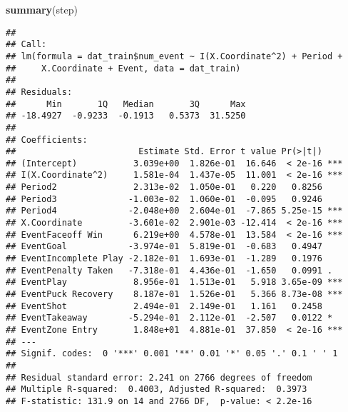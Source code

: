 \documentclass[
  a3paper,
]{article}
\newenvironment{Shaded}{\begin{snugshade}}{\end{snugshade}}
\newcommand{\AttributeTok}[1]{\textcolor[rgb]{0.13,0.29,0.53}{#1}}
\newcommand{\CommentTok}[1]{\textcolor[rgb]{0.56,0.35,0.01}{\textit{#1}}}
\newcommand{\DecValTok}[1]{\textcolor[rgb]{0.00,0.00,0.81}{#1}}
\newcommand{\FunctionTok}[1]{\textcolor[rgb]{0.13,0.29,0.53}{\textbf{#1}}}
\newcommand{\NormalTok}[1]{#1}
\newcommand{\OtherTok}[1]{\textcolor[rgb]{0.56,0.35,0.01}{#1}}
\newcommand{\SpecialCharTok}[1]{\textcolor[rgb]{0.81,0.36,0.00}{\textbf{#1}}}
\begin{document}
\begin{Shaded}
\begin{Highlighting}[]
\FunctionTok{summary}\NormalTok{(step)}
\end{Highlighting}
\end{Shaded}

\begin{verbatim}
## 
## Call:
## lm(formula = dat_train$num_event ~ I(X.Coordinate^2) + Period + 
##     X.Coordinate + Event, data = dat_train)
## 
## Residuals:
##      Min       1Q   Median       3Q      Max 
## -18.4927  -0.9233  -0.1913   0.5373  31.5250 
## 
## Coefficients:
##                        Estimate Std. Error t value Pr(>|t|)    
## (Intercept)           3.039e+00  1.826e-01  16.646  < 2e-16 ***
## I(X.Coordinate^2)     1.581e-04  1.437e-05  11.001  < 2e-16 ***
## Period2               2.313e-02  1.050e-01   0.220   0.8256    
## Period3              -1.003e-02  1.060e-01  -0.095   0.9246    
## Period4              -2.048e+00  2.604e-01  -7.865 5.25e-15 ***
## X.Coordinate         -3.601e-02  2.901e-03 -12.414  < 2e-16 ***
## EventFaceoff Win      6.219e+00  4.578e-01  13.584  < 2e-16 ***
## EventGoal            -3.974e-01  5.819e-01  -0.683   0.4947    
## EventIncomplete Play -2.182e-01  1.693e-01  -1.289   0.1976    
## EventPenalty Taken   -7.318e-01  4.436e-01  -1.650   0.0991 .  
## EventPlay             8.956e-01  1.513e-01   5.918 3.65e-09 ***
## EventPuck Recovery    8.187e-01  1.526e-01   5.366 8.73e-08 ***
## EventShot             2.494e-01  2.149e-01   1.161   0.2458    
## EventTakeaway        -5.294e-01  2.112e-01  -2.507   0.0122 *  
## EventZone Entry       1.848e+01  4.881e-01  37.850  < 2e-16 ***
## ---
## Signif. codes:  0 '***' 0.001 '**' 0.01 '*' 0.05 '.' 0.1 ' ' 1
## 
## Residual standard error: 2.241 on 2766 degrees of freedom
## Multiple R-squared:  0.4003, Adjusted R-squared:  0.3973 
## F-statistic: 131.9 on 14 and 2766 DF,  p-value: < 2.2e-16
\end{verbatim}

\begin{Shaded}
\end{Shaded}
\end{document}
